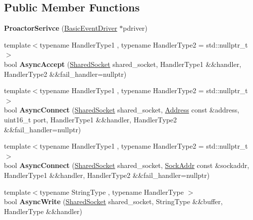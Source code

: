 \subsection*{Public Member Functions}
\begin{DoxyCompactItemize}
\item 
\hypertarget{classlsf_1_1asio_1_1async_1_1ProactorSerivce_a0cbf6b525d13721e4c3fb6e128708ba4}{
{\bfseries ProactorSerivce} (\hyperlink{classlsf_1_1asio_1_1async_1_1BasicEventDriver}{BasicEventDriver} $\ast$pdriver)}
\label{classlsf_1_1asio_1_1async_1_1ProactorSerivce_a0cbf6b525d13721e4c3fb6e128708ba4}

\item 
\hypertarget{classlsf_1_1asio_1_1async_1_1ProactorSerivce_a9c2ba845eff58eb3de8808efbbebba09}{
{\footnotesize template$<$typename HandlerType1 , typename HandlerType2  = std::nullptr\_\-t$>$ }\\bool {\bfseries AsyncAccept} (\hyperlink{classlsf_1_1asio_1_1SharedSocket}{SharedSocket} shared\_\-socket, HandlerType1 \&\&handler, HandlerType2 \&\&fail\_\-handler=nullptr)}
\label{classlsf_1_1asio_1_1async_1_1ProactorSerivce_a9c2ba845eff58eb3de8808efbbebba09}

\item 
\hypertarget{classlsf_1_1asio_1_1async_1_1ProactorSerivce_a82fdfae765df9c0d2424e1aece967dfb}{
{\footnotesize template$<$typename HandlerType1 , typename HandlerType2  = std::nullptr\_\-t$>$ }\\bool {\bfseries AsyncConnect} (\hyperlink{classlsf_1_1asio_1_1SharedSocket}{SharedSocket} shared\_\-socket, \hyperlink{classlsf_1_1asio_1_1Address}{Address} const \&address, uint16\_\-t port, HandlerType1 \&\&handler, HandlerType2 \&\&fail\_\-handler=nullptr)}
\label{classlsf_1_1asio_1_1async_1_1ProactorSerivce_a82fdfae765df9c0d2424e1aece967dfb}

\item 
\hypertarget{classlsf_1_1asio_1_1async_1_1ProactorSerivce_a7bd63579178580d47211072f4221ff9a}{
{\footnotesize template$<$typename HandlerType1 , typename HandlerType2  = std::nullptr\_\-t$>$ }\\bool {\bfseries AsyncConnect} (\hyperlink{classlsf_1_1asio_1_1SharedSocket}{SharedSocket} shared\_\-socket, \hyperlink{classlsf_1_1asio_1_1SockAddr}{SockAddr} const \&sockaddr, HandlerType1 \&\&handler, HandlerType2 \&\&fail\_\-handler=nullptr)}
\label{classlsf_1_1asio_1_1async_1_1ProactorSerivce_a7bd63579178580d47211072f4221ff9a}

\item 
\hypertarget{classlsf_1_1asio_1_1async_1_1ProactorSerivce_a5371f4da671cdfd2784f2bd96d295617}{
{\footnotesize template$<$typename StringType , typename HandlerType $>$ }\\bool {\bfseries AsyncWrite} (\hyperlink{classlsf_1_1asio_1_1SharedSocket}{SharedSocket} shared\_\-socket, StringType \&\&buffer, HandlerType \&\&handler)}
\label{classlsf_1_1asio_1_1async_1_1ProactorSerivce_a5371f4da671cdfd2784f2bd96d295617}


\end{DoxyCompactItemize}
